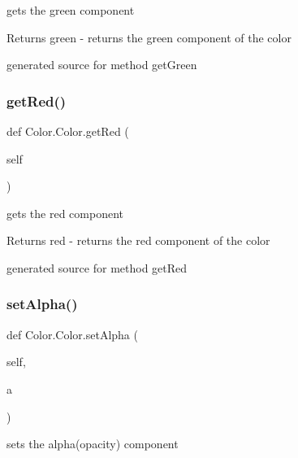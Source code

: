 gets the green component 

\begin{DoxyReturn}{Returns}
green -\/ returns the green component of the color\begin{DoxyVerb}generated source for method getGreen \end{DoxyVerb}
 
\end{DoxyReturn}
\hypertarget{class_color_1_1_color_af714dcb6373051df8548d41ea4160896}{}\label{class_color_1_1_color_af714dcb6373051df8548d41ea4160896} 
\subsubsection{\texorpdfstring{get\+Red()}{getRed()}}
{\footnotesize\ttfamily def Color.\+Color.\+get\+Red (\begin{DoxyParamCaption}\item[{}]{self }\end{DoxyParamCaption})}



gets the red component 

\begin{DoxyReturn}{Returns}
red -\/ returns the red component of the color\begin{DoxyVerb}generated source for method getRed \end{DoxyVerb}
 
\end{DoxyReturn}
\hypertarget{class_color_1_1_color_a794d9889de916d2d45f29437547feddd}{}\label{class_color_1_1_color_a794d9889de916d2d45f29437547feddd} 
\subsubsection{\texorpdfstring{set\+Alpha()}{setAlpha()}}
{\footnotesize\ttfamily def Color.\+Color.\+set\+Alpha (\begin{DoxyParamCaption}\item[{}]{self,  }\item[{}]{a }\end{DoxyParamCaption})}



sets the alpha(opacity) component 


